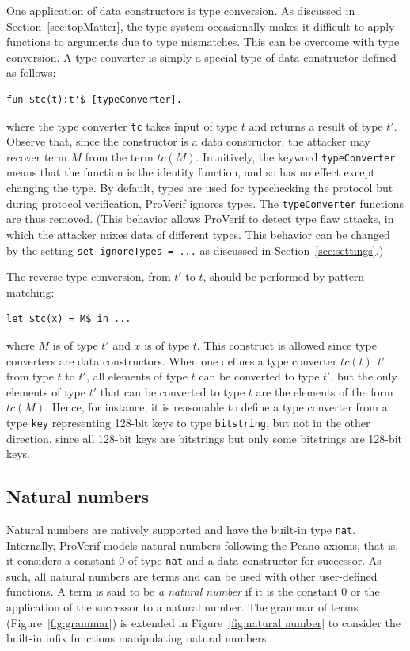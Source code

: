\documentclass{book}
\begin{document}
One application of data constructors is type conversion. As discussed in Section~\ref{sec:topMatter}, the type system occasionally makes it difficult to apply functions to arguments due to type mismatches. This can be overcome with type conversion. A type converter is simply a special type of data constructor defined as follows:
\begin{lstlisting}[numbers=none]
	fun $tc(t):t'$ [typeConverter].
\end{lstlisting}
where the type converter \lstinline!tc! takes input of type $t$ and returns a result of type $t'$. Observe that, since the constructor is a data constructor, the attacker may recover term $M$ from the term $tc(M)$. Intuitively, the keyword \lstinline!typeConverter! means that the function is the identity function, and so has no effect except changing the type. By default, types are used for typechecking the protocol but during protocol verification, ProVerif ignores types. The \lstinline!typeConverter! functions are thus removed. (This behavior allows ProVerif to detect type flaw attacks, in which the attacker mixes data of different types. This behavior can be changed by the setting \lstinline!set ignoreTypes = ...! as discussed in Section~\ref{sec:settings}.)

The reverse type conversion, from $t'$ to $t$, should be performed by pattern-matching:
\begin{lstlisting}[numbers=none]
	let $tc(x) = M$ in ...
\end{lstlisting}
where $M$ is of type $t'$ and $x$ is of type $t$.
This construct is allowed since type converters are data constructors. When one defines a type converter $tc(t):t'$ from type $t$ to $t'$, all elements of type $t$ can be converted to type $t'$, but the only elements of type $t'$ that can be converted to type $t$ are the elements of the form $tc(M)$. Hence, for instance, it is reasonable to define a type converter from a type \lstinline!key! representing 128-bit keys to type \lstinline!bitstring!, but not in the other direction, since all 128-bit keys are bitstrings but only some bitstrings are 128-bit keys.

\subsection{Natural numbers}\label{sec:naturalNumbers}

Natural numbers are natively supported and have the built-in type \lstinline!nat!. Internally, ProVerif models natural numbers following the Peano axioms, that is, it considers a constant $0$ of type \lstinline!nat! and a data constructor for successor. As such, all natural numbers are terms and can be used with other user-defined functions. A term is said to be \emph{a natural number} if it is the constant $0$ or the application of the successor to a natural number. The grammar of terms (Figure~\ref{fig:grammar}) is extended in Figure~\ref{fig:natural number} to consider the built-in infix functions manipulating natural numbers.
\end{document}
